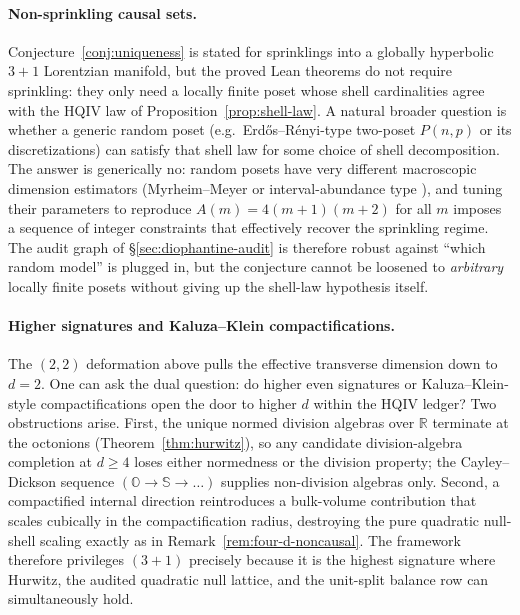 \documentclass[11pt]{amsart}
\begin{document}
\paragraph{Non-sprinkling causal sets.}
Conjecture~\ref{conj:uniqueness} is stated for sprinklings into a globally hyperbolic \(3{+}1\) Lorentzian manifold, but the proved Lean theorems do not require sprinkling: they only need a locally finite poset whose shell cardinalities agree with the HQIV law of Proposition~\ref{prop:shell-law}. A natural broader question is whether a generic random poset (e.g.\ Erd\H{o}s--R\'enyi-type two-poset \(P(n,p)\) or its discretizations) can satisfy that shell law for some choice of shell decomposition. The answer is generically no: random posets have very different macroscopic dimension estimators (Myrheim--Meyer or interval-abundance type \cite{Sorkin2005}), and tuning their parameters to reproduce \(A(m)=4(m+1)(m+2)\) for all \(m\) imposes a sequence of integer constraints that effectively recover the sprinkling regime. The audit graph of \S\ref{sec:diophantine-audit} is therefore robust against ``which random model'' is plugged in, but the conjecture cannot be loosened to \emph{arbitrary} locally finite posets without giving up the shell-law hypothesis itself.

\paragraph{Higher signatures and Kaluza--Klein compactifications.}
The \((2,2)\) deformation above pulls the effective transverse dimension down to \(d=2\). One can ask the dual question: do higher even signatures or Kaluza--Klein-style compactifications open the door to higher \(d\) within the HQIV ledger? Two obstructions arise. First, the unique normed division algebras over \(\mathbb{R}\) terminate at the octonions (Theorem~\ref{thm:hurwitz}), so any candidate division-algebra completion at \(d\ge 4\) loses either normedness or the division property; the Cayley--Dickson sequence \((\mathbb{O}\to\mathbb{S}\to\dots)\) supplies non-division algebras only. Second, a compactified internal direction reintroduces a bulk-volume contribution that scales cubically in the compactification radius, destroying the pure quadratic null-shell scaling exactly as in Remark~\ref{rem:four-d-noncausal}. The framework therefore privileges \((3+1)\) precisely because it is the highest signature where Hurwitz, the audited quadratic null lattice, and the unit-split balance row can simultaneously hold.
\end{document}
